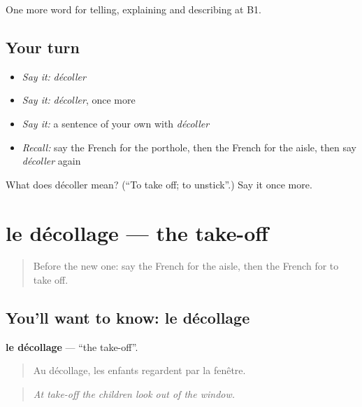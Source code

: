 \begin{grammarlens}[title={What you've built}]
One more word for telling, explaining and describing at B1.
\end{grammarlens}

\subsection*{Your turn}
\begin{itemize}
\raggedright
  \item \emph{Say it:} \emph{décoller}
  \item \emph{Say it:} \emph{décoller}, once more
  \item \emph{Say it:} a sentence of your own with \emph{décoller}
  \item \emph{Recall:} say the French for the porthole, then the French for the aisle, then say \emph{décoller} again
\end{itemize}

\begin{tcolorbox}[breakable,colback=teal!4,colframe=teal!35!black,title={Before you move on}]
What does décoller mean? (\textquotedblleft{}To take off; to unstick\textquotedblright{}.) Say it once more.
\end{tcolorbox}
\section[le décollage]{le décollage — the take-off}

\label{lesson:FR-C419-decollage}



\begin{quote}
Before the new one: say the French for the aisle, then the French for to take off.
\end{quote}

\subsection*{You'll want to know: le décollage}
\textbf{le décollage} — \textquotedblleft{}the take-off\textquotedblright{}.

\begin{quote}
Au décollage, les enfants regardent par la fenêtre.
\end{quote}

\begin{quote}
\emph{At take-off the children look out of the window.}
\end{quote}

